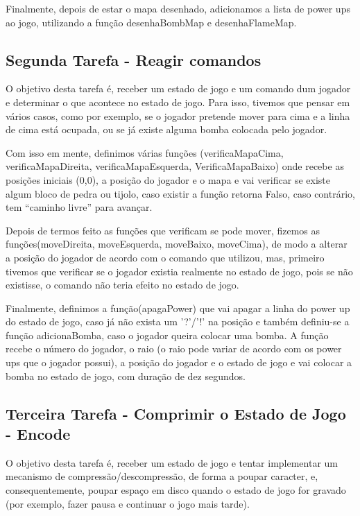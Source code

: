 \documentclass[a4paper]{article}
\begin{document}
Finalmente, depois de estar o mapa desenhado, adicionamos a lista de power ups ao jogo, utilizando a função desenhaBombMap e desenhaFlameMap.

\subsection{Segunda Tarefa - Reagir comandos}
\label{subsec:tarefa2sol}

O objetivo desta tarefa é, receber um estado de jogo e um comando dum jogador e determinar o que acontece no estado de jogo.
Para isso, tivemos que pensar em vários casos, como por exemplo, se o jogador pretende mover para cima e a linha de cima está ocupada, ou se já existe alguma bomba colocada pelo jogador.

Com isso em mente, definimos várias funções (verificaMapaCima, verificaMapaDireita,
verificaMapaEsquerda, VerificaMapaBaixo)
onde recebe as posições iniciais (0,0), a posição do jogador e o mapa
e vai verificar se existe algum bloco de pedra ou tijolo, caso existir a função retorna Falso, caso contrário, tem “caminho livre” para avançar.

Depois de termos feito as funções que verificam se pode mover, fizemos as funções(moveDireita, moveEsquerda,
moveBaixo, moveCima), de modo a alterar a posição do jogador de acordo com o comando que utilizou, mas, primeiro tivemos que verificar se o jogador existia realmente no estado de jogo, pois se não
existisse, o comando não teria efeito no estado de jogo.

Finalmente, definimos a função(apagaPower) que vai apagar a linha do power up do estado de jogo, caso já não exista um '?'/'!' na posição e também definiu-se a função adicionaBomba, caso o jogador
queira colocar uma bomba. A função recebe o número do jogador, o raio (o raio pode variar de acordo com os power ups que o jogador possui), a posição do jogador e o estado de jogo e vai colocar a bomba no estado de jogo, com duração de dez segundos.

\subsection{Terceira Tarefa - Comprimir o Estado de Jogo - Encode }
\label{subsec:tarefa3encode}
O objetivo desta tarefa é, receber um estado de jogo e tentar implementar um mecanismo de compressão/descompressão, de forma a poupar caracter, e, consequentemente, poupar
espaço em disco quando o estado de jogo for gravado (por exemplo, fazer pausa e continuar o jogo mais tarde).
\end{document}
